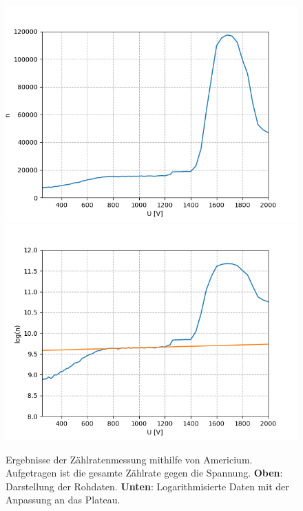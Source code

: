 \documentclass[12pt,a4paper]{article}
\begin{document}
\begin{figure}
\centering
\includegraphics[scale=0.8]{Bilder/Prop/Am_lin.PNG}
\includegraphics[scale=0.8]{Bilder/Prop/Am_log.PNG}
\caption{Ergebnisse der Zählratenmessung mithilfe von Americium. Aufgetragen ist die gesamte Zählrate gegen die Spannung. \textbf{Oben}: Darstellung der Rohdaten. \textbf{Unten}: Logarithmisierte Daten mit der Anpassung an das Plateau.}
\label{fig:amlin}
\end{figure}
\end{document}
